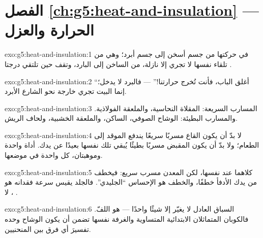 \section*{الفصل \ref{ch:g5:heat-and-insulation} --- الحرارة والعزل}

\begin{solution}{exo:g5:heat-and-insulation:1}
  في حركتها من جسم أسخن إلى جسم أبرد؛ وهي من تلقاء
نفسها لا تجري إلا نازلة، من الساخن إلى البارد، وتقف حين تلتقي
درجتا .
\end{solution}

\begin{solution}{exo:g5:heat-and-insulation:2}
``أغلق الباب، فأنت تُخرج حرارتنا!'' --- فالبرد لا يدخل؛ إنما
 البيت تجري خارجة نحو الشارع الأبرد.
\end{solution}

\begin{solution}{exo:g5:heat-and-insulation:3}
المسارب السريعة: المقلاة النحاسية، والملعقة الفولاذية. والمسارب
البطيئة: الوشاح الصوفي،  الساكن، والملعقة الخشبية، ولحاف
الريش.
\end{solution}

\begin{solution}{exo:g5:heat-and-insulation:4}
لا بدّ أن يكون القاع مسربًا سريعًا يندفع  الموقد إلى
الطعام؛ ولا بدّ أن يكون المقبض مسربًا بطيئًا يُبقي تلك 
نفسها بعيدًا عن يدك. أداة واحدة وموهبتان، كل واحدة في
موضعها.
\end{solution}

\begin{solution}{exo:g5:heat-and-insulation:5}
كلاهما عند  نفسها، لكن المعدن مسرب سريع: فيخطف
 من يدك الأدفأ خطفًا، والخطف هو الإحساس ``الجليدي''.
فالجلد يقيس سرعة فقدانه هو ، لا .
\end{solution}

\begin{solution}{exo:g5:heat-and-insulation:6}
السباق العادل لا يغيّر إلا شيئًا واحدًا --- هو اللفّ. فالكوبان
المتماثلان  الابتدائية المتساوية والغرفة نفسها تضمن أن
يكون الوشاح وحده تفسيرَ أي فرق بين المنحنيين.
\end{solution}

